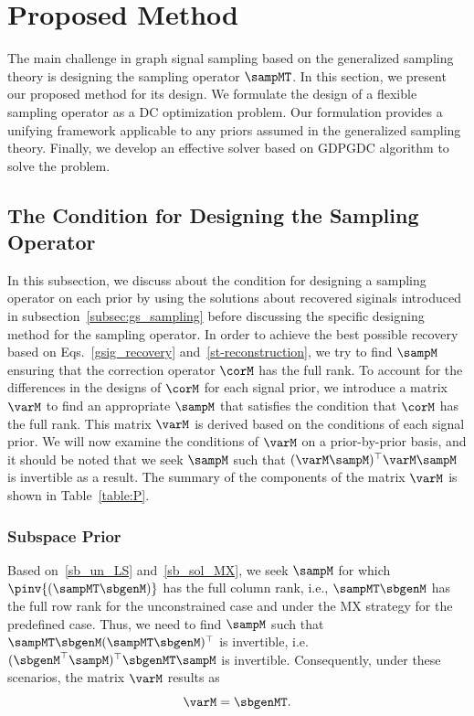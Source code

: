 \documentclass[journal]{IEEEtran}
\begin{document}
\section{Proposed Method}
\label{sec:propose}
The main challenge in graph signal sampling based on the generalized sampling theory is designing the sampling operator $\sampMT$. 
In this section, we present our proposed method for its design.
We formulate the design of a flexible sampling operator as a DC optimization problem.
Our formulation provides a unifying framework applicable to any priors assumed in the generalized sampling theory. 
Finally, we develop an effective solver based on GDPGDC algorithm to solve the problem.

\subsection{The Condition for Designing the Sampling Operator}
\label{subsec:condition_for_sampling_operator}
In this subsection, we discuss about the condition for designing a sampling operator on each prior by using the solutions about recovered siginals introduced in subsection~\ref{subsec:gs_sampling} before discussing the specific designing method for the sampling operator.
In order to achieve the best possible recovery based on Eqs.~\eqref{gsig_recovery} and~\eqref{st-reconstruction}, we try to find $\sampM$ ensuring that the correction operator $\corM$ has the full rank.
To account for the differences in the designs of $\corM$ for each signal prior, we introduce a matrix $\varM$ to find an appropriate $\sampM$ that satisfies the condition that $\corM$ has the full rank.
This matrix $\varM$ is derived based on the conditions of each signal prior.
We will now examine the conditions of $\varM$ on a prior-by-prior basis, and it should be noted that we seek $\sampM$ such that $(\varM \sampM)^\top \varM \sampM$ is invertible as a result.
The summary of the components of the matrix $\varM$ is shown in Table~\ref{table:P}.

\subsubsection{Subspace Prior}
Based on~\eqref{sb_un_LS} and~\eqref{sb_sol_MX}, we seek $\sampM$ for which $\pinv{(\sampMT\sbgenM)}$ has the full column rank, i.e., $\sampMT\sbgenM$ has the full row rank for the unconstrained case and under the MX strategy for the predefined case.
Thus, we need to find $\sampM$ such that $\sampMT \sbgenM (\sampMT \sbgenM)^\top$ is invertible, i.e. $(\sbgenM^\top \sampM)^\top \sbgenMT \sampM$ is invertible.
Consequently, under these scenarios, the matrix $\varM$ results as 
\begin{equation}
    \varM = \sbgenMT.
\end{equation}
\end{document}
